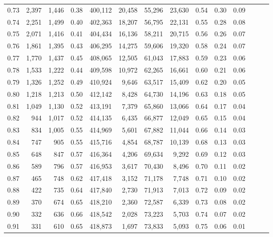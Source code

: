 \begin{tabular}{rrrrrrrrrrrrrr}
0.73 &  2,397 &  1,446 &  0.38 &  400,112 &   20,458 &  55,296 &  23,630 &  0.54 &  0.30 &      0.09 \\
0.74 &  2,251 &  1,499 &  0.40 &  402,363 &   18,207 &  56,795 &  22,131 &  0.55 &  0.28 &      0.08 \\
0.75 &  2,071 &  1,416 &  0.41 &  404,434 &   16,136 &  58,211 &  20,715 &  0.56 &  0.26 &      0.07 \\
0.76 &  1,861 &  1,395 &  0.43 &  406,295 &   14,275 &  59,606 &  19,320 &  0.58 &  0.24 &      0.07 \\
0.77 &  1,770 &  1,437 &  0.45 &  408,065 &   12,505 &  61,043 &  17,883 &  0.59 &  0.23 &      0.06 \\
0.78 &  1,533 &  1,222 &  0.44 &  409,598 &   10,972 &  62,265 &  16,661 &  0.60 &  0.21 &      0.06 \\
0.79 &  1,326 &  1,252 &  0.49 &  410,924 &    9,646 &  63,517 &  15,409 &  0.62 &  0.20 &      0.05 \\
0.80 &  1,218 &  1,213 &  0.50 &  412,142 &    8,428 &  64,730 &  14,196 &  0.63 &  0.18 &      0.05 \\
0.81 &  1,049 &  1,130 &  0.52 &  413,191 &    7,379 &  65,860 &  13,066 &  0.64 &  0.17 &      0.04 \\
0.82 &    944 &  1,017 &  0.52 &  414,135 &    6,435 &  66,877 &  12,049 &  0.65 &  0.15 &      0.04 \\
0.83 &    834 &  1,005 &  0.55 &  414,969 &    5,601 &  67,882 &  11,044 &  0.66 &  0.14 &      0.03 \\
0.84 &    747 &    905 &  0.55 &  415,716 &    4,854 &  68,787 &  10,139 &  0.68 &  0.13 &      0.03 \\
0.85 &    648 &    847 &  0.57 &  416,364 &    4,206 &  69,634 &   9,292 &  0.69 &  0.12 &      0.03 \\
0.86 &    589 &    796 &  0.57 &  416,953 &    3,617 &  70,430 &   8,496 &  0.70 &  0.11 &      0.02 \\
0.87 &    465 &    748 &  0.62 &  417,418 &    3,152 &  71,178 &   7,748 &  0.71 &  0.10 &      0.02 \\
0.88 &    422 &    735 &  0.64 &  417,840 &    2,730 &  71,913 &   7,013 &  0.72 &  0.09 &      0.02 \\
0.89 &    370 &    674 &  0.65 &  418,210 &    2,360 &  72,587 &   6,339 &  0.73 &  0.08 &      0.02 \\
0.90 &    332 &    636 &  0.66 &  418,542 &    2,028 &  73,223 &   5,703 &  0.74 &  0.07 &      0.02 \\
0.91 &    331 &    610 &  0.65 &  418,873 &    1,697 &  73,833 &   5,093 &  0.75 &  0.06 &      0.01 \\

\end{tabular}
